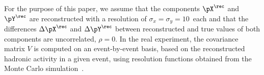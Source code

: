 For the purpose of this paper,
we assume that the components $\pX^{\rec}$ and $\pY^{\rec}$ are reconstructed with a resolution of $\sigma_{x} = \sigma_{y} = 10$~\GeV each
and that the differences $\Delta\pX^{\rec}$ and $\Delta\pY^{\rec}$ 
between reconstructed and true values of both components are uncorrelated, \ie $\rho = 0$.
In the real experiment, the covariance matrix $V$ is computed on an
event-by-event basis, based on the reconstructed hadronic activity in a given event,
using resolution functions obtained from the Monte Carlo simulation~\cite{CMS-JME-13-003,CMS-JME-10-009}.
